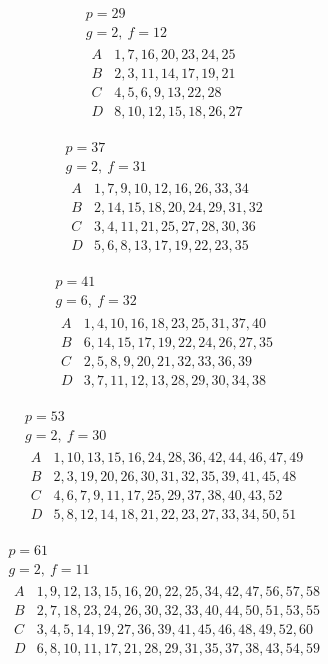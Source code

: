 \[
\begin{gathered}
p=29\\
g=2,\ f=12\\[3pt]
\begin{array}{c|l}
A&1,7,16,20,23,24,25\\
B&2,3,11,14,17,19,21\\
C&4,5,6,9,13,22,28\\
D&8,10,12,15,18,26,27
\end{array}
\end{gathered}
\]

%
\[
\begin{gathered}
p=37\\
g=2,\ f=31\\[3pt]
\begin{array}{c|l}
A&1,7,9,10,12,16,26,33,34\\
B&2,14,15,18,20,24,29,31,32\\
C&3,4,11,21,25,27,28,30,36\\
D&5,6,8,13,17,19,22,23,35
\end{array}
\end{gathered}
\]

\[
\begin{gathered}
p=41\\
g=6,\ f=32\\[3pt]
\begin{array}{c|l}
A&1,4,10,16,18,23,25,31,37,40\\
B&6,14,15,17,19,22,24,26,27,35\\
C&2,5,8,9,20,21,32,33,36,39\\
D&3,7,11,12,13,28,29,30,34,38
\end{array}
\end{gathered}
\]

\[
\begin{gathered}
p=53\\
g=2,\ f=30\\[3pt]
\begin{array}{c|l}
A&1,10,13,15,16,24,28,36,42,44,46,47,49\\
B&2,3,19,20,26,30,31,32,35,39,41,45,48\\
C&4,6,7,9,11,17,25,29,37,38,40,43,52\\
D&5,8,12,14,18,21,22,23,27,33,34,50,51
\end{array}
\end{gathered}
\]

\[
\begin{gathered}
p=61\\
g=2,\ f=11\\[3pt]
\begin{array}{c|l}
A&1,9,12,13,15,16,20,22,25,34,42,47,56,57,58\\
B&2,7,18,23,24,26,30,32,33,40,44,50,51,53,55\\
C&3,4,5,14,19,27,36,39,41,45,46,48,49,52,60\\
D&6,8,10,11,17,21,28,29,31,35,37,38,43,54,59
\end{array}
\end{gathered}
\]

